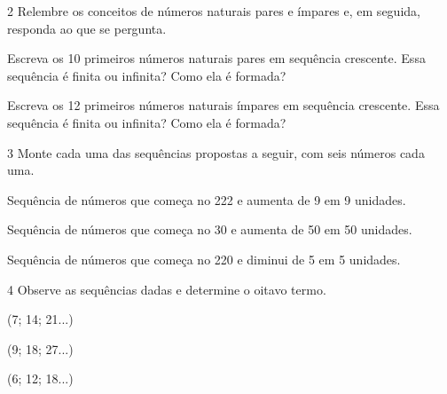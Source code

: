 \num{2} Relembre os conceitos de números naturais pares e ímpares e, em seguida,
responda ao que se pergunta.

\begin{escolha}
\item
  Escreva os 10 primeiros números naturais pares em sequência crescente.
  Essa sequência é finita ou infinita? Como ela é formada?\\

\item
  Escreva os 12 primeiros números naturais ímpares em sequência
  crescente. Essa sequência é finita ou infinita? Como ela é formada?\\
\end{escolha}


\pagebreak
\num{3} Monte cada uma das sequências propostas a seguir, com seis números cada uma.

\begin{escolha}
\item
  Sequência de números que começa no 222 e aumenta de 9 em 9 unidades.\\

\item
  Sequência de números que começa no 30 e aumenta de 50 em 50 unidades.\\

\item
  Sequência de números que começa no 220 e diminui de 5 em 5 unidades.\\
\end{escolha}


\num{4} Observe as sequências dadas e determine o oitavo termo.

\begin{escolha}
  \item (7; 14; 21...) 

  \item (9; 18; 27...) 

  \item (6; 12; 18...) 
  \end{escolha}


